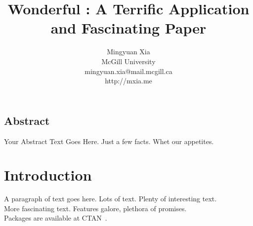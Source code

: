\documentclass[letterpaper,twocolumn,10pt]{article}
\newcommand{\cameraready}[2]{#1} %
\begin{document}
\date{}

\title{\Large \bf Wonderful : A Terrific Application and Fascinating Paper}

\author{
{\rm Mingyuan Xia}\\
McGill University\\
mingyuan.xia@mail.mcgill.ca\\
http://mxia.me
} %

\maketitle

\cameraready{}{
\thispagestyle{empty}
}

\subsection*{Abstract}
Your Abstract Text Goes Here.  Just a few facts.
Whet our appetites.

\section{Introduction}

A paragraph of text goes here.  Lots of text.  Plenty of interesting
text. \\

More fascinating text. Features galore, plethora of promises.\\

Packages are available at CTAN~\cite{greenwade93}.
\cameraready{}{
\section{Acknowledgments}

A polite author always includes acknowledgments.  Thank everyone,
especially those who funded the work. 
}

\balance
{\footnotesize 
}


\theendnotes
\end{document}
